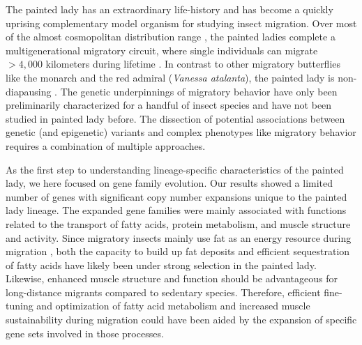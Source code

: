 \documentclass[twocolumn]{bmcart}%
\begin{document}
The painted lady has an extraordinary life-history and has become a quickly uprising complementary model organism for studying insect migration. Over most of the almost cosmopolitan distribution range \citep{shieldsJournalLepidopteristsSociety1992}, the painted ladies complete a multigenerational migratory circuit, where single individuals can migrate $>4,000$ kilometers during lifetime \citep{talaveraDiscoveryMassMigration2016}. In contrast to other migratory butterflies like the monarch and the red admiral (\textit{Vanessa atalanta}), the painted lady is non-diapausing \citep{shieldsJournalLepidopteristsSociety1992}. The genetic underpinnings of migratory behavior have only been preliminarily characterized for a handful of insect species \citep{kangAnalysisLargescaleGene2004, zhuDefiningBehavioralMolecular2009} and have not been studied in painted lady before. The dissection of potential associations between genetic (and epigenetic) variants and complex phenotypes like migratory behavior requires a combination of multiple approaches. 

As the first step to understanding lineage-specific characteristics of the painted lady, we here focused on gene family evolution. Our results showed a limited number of genes with significant copy number expansions unique to the painted lady lineage. The expanded gene families were mainly associated with functions related to the transport of fatty acids, protein metabolism, and muscle structure and activity. Since migratory insects mainly use fat as an energy resource during migration \citep{landysMetabolicProfileLongdistance2005, murataUtilizationLipidFlight2013, srygleyOptimalStrategiesInsects2008, weberPhysiologyLongdistanceMigration2009}, both the capacity to build up fat deposits and efficient sequestration of fatty acids have likely been under strong selection in the painted lady. Likewise, enhanced muscle structure and function should be advantageous for long-distance migrants compared to sedentary species. Therefore, efficient fine-tuning and optimization of fatty acid metabolism and increased muscle sustainability during migration could have been aided by the expansion of specific gene sets involved in those processes.
\end{document}
